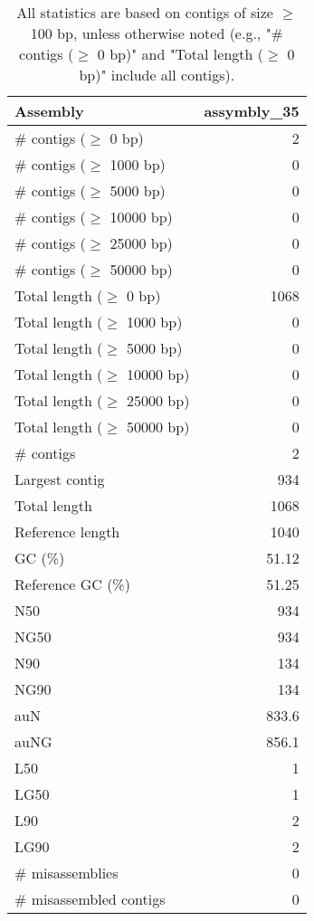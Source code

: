 \documentclass[12pt,a4paper]{article}
\begin{document}
\begin{table}[ht]
\begin{center}
\caption{All statistics are based on contigs of size $\geq$ 100 bp, unless otherwise noted (e.g., "\# contigs ($\geq$ 0 bp)" and "Total length ($\geq$ 0 bp)" include all contigs).}
\begin{tabular}{|l*{1}{|r}|}
\hline
Assembly & assymbly\_35 \\ \hline
\# contigs ($\geq$ 0 bp) & 2 \\ \hline
\# contigs ($\geq$ 1000 bp) & 0 \\ \hline
\# contigs ($\geq$ 5000 bp) & 0 \\ \hline
\# contigs ($\geq$ 10000 bp) & 0 \\ \hline
\# contigs ($\geq$ 25000 bp) & 0 \\ \hline
\# contigs ($\geq$ 50000 bp) & 0 \\ \hline
Total length ($\geq$ 0 bp) & 1068 \\ \hline
Total length ($\geq$ 1000 bp) & 0 \\ \hline
Total length ($\geq$ 5000 bp) & 0 \\ \hline
Total length ($\geq$ 10000 bp) & 0 \\ \hline
Total length ($\geq$ 25000 bp) & 0 \\ \hline
Total length ($\geq$ 50000 bp) & 0 \\ \hline
\# contigs & 2 \\ \hline
Largest contig & 934 \\ \hline
Total length & 1068 \\ \hline
Reference length & 1040 \\ \hline
GC (\%) & 51.12 \\ \hline
Reference GC (\%) & 51.25 \\ \hline
N50 & 934 \\ \hline
NG50 & 934 \\ \hline
N90 & 134 \\ \hline
NG90 & 134 \\ \hline
auN & 833.6 \\ \hline
auNG & 856.1 \\ \hline
L50 & 1 \\ \hline
LG50 & 1 \\ \hline
L90 & 2 \\ \hline
LG90 & 2 \\ \hline
\# misassemblies & 0 \\ \hline
\# misassembled contigs & 0 \\ \hline

\end{tabular}
\end{center}
\end{table}
\end{document}
